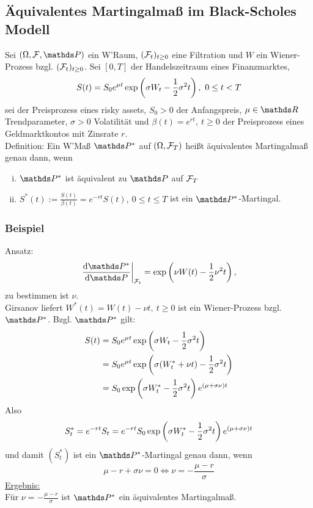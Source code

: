 \subsection{Äquivalentes Martingalmaß im Black-Scholes Modell}
\label{sub:aquiv_martingmass_im_b_s_modell}
Sei $(\Omega,\F,\Pw)$ ein W'Raum, $(\mathcal{F}_t)_{t\ge 0}$ eine Filtration und $W$ ein Wiener-Prozess bzgl. $(\mathcal{F}_t)_{t\ge0}$.
Sei $[0,T]$ der Handelszeitraum eines Finanzmarktes,
\[
S(t)=S_0 e^{\mu t}\exp\left( \sigma W_t-\frac{1}{2}\sigma^2t\right),~0\le t<T
\]
sei der Preisprozess eines risky assets, $S_0>0$ der Anfangspreis, $\mu\in \R$ Trendparameter, $\sigma>0$ Volatilität und $\beta(t)=e^{rt},~t\ge 0$ der Preisprozess eines Geldmarktkontos mit Zinsrate $r$.\\
Definition: Ein W'Maß $\Pw^*$ auf $(\Omega,\mathcal{F}_T)$ heißt äquivalentes Martingalmaß genau dann, wenn
\begin{enumerate}[(i)]
	\item $\Pw^*$ ist äquivalent zu $\Pw$ auf $\mathcal{F}_T$
	\item $S^*(t):=\frac{S(t)}{\beta(t)}=e^{-rt}S(t),~0\le t\le T$ ist ein $\Pw^*$-Martingal.
\end{enumerate}

\subsubsection*{Beispiel}
Ansatz: 
\[
\left.\difff{\Pw^*}{\Pw}\right|_{\F_t}=\exp\enbrace{\nu W(t)-\frac{1}{2}\nu^2t},
\]
zu bestimmen ist $\nu$.\\
Girsanov liefert $W^*(t)=W(t)-\nu t,~t\ge 0$ ist ein Wiener-Prozess bzgl. $\Pw^*$.
Bzgl. $\Pw^*$ gilt:
\begin{equation*}
\begin{aligned}
	S(t)&=S_0 e^{\mu t}\exp\left( \sigma W_t-\frac{1}{2}\sigma^2t\right)\\
	&=S_0 e^{\mu t}\exp\left( \sigma (W_t^*+\nu t)-\frac{1}{2}\sigma^2t\right)\\
	&=S_0 \exp\left( \sigma W_t^*-\frac{1}{2}\sigma^2t\right) e^{(\mu+\sigma \nu)t}
\end{aligned}
\end{equation*}
Also
\[
S_t^*=e^{-rt}S_t=e^{-rt}S_0 \exp\left( \sigma W_t^*-\frac{1}{2}\sigma^2t\right) e^{(\mu+\sigma \nu)t}
\]
und damit $(S_t^*)$ ist ein $\Pw^*$-Martingal genau dann, wenn
\[
\mu -r+\sigma \nu=0 \Leftrightarrow \nu = -\frac{\mu-r}{\sigma}
\]
\uline{Ergebnis:}\\
Für $\nu = -\frac{\mu-r}{\sigma}$ ist $\Pw^*$ ein äquivalentes Martingalmaß.\\

